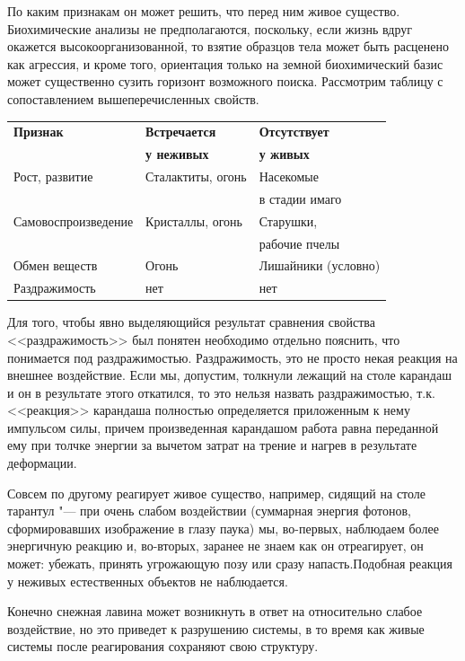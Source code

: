 \documentclass[12pt,a4paper,oneside]{book}
\begin{document}
По каким признакам он может решить, что перед ним живое существо. Биохимические анализы не предполагаются, поскольку, если жизнь вдруг окажется высокоорганизованной, то взятие образцов тела может быть расценено как агрессия, и кроме того, ориентация только на земной биохимический базис может существенно сузить горизонт возможного поиска. Рассмотрим таблицу с сопоставлением вышеперечисленных свойств.

\begin{center}
\begin{tabular}{|l|l|l|}
	\hline
	\textbf{Признак} & \textbf{Встречается} & \textbf{Отсутствует} \\
	& \textbf{у неживых} & \textbf{у живых} \\
	\hline
	Рост, развитие & Сталактиты, огонь & Насекомые \\
	& & в стадии имаго \\
	\hline
	Самовоспроизведение & Кристаллы, огонь & Старушки, \\
	& & рабочие пчелы \\
	\hline
	Обмен веществ & Огонь & Лишайники (условно) \\
	\hline
	Раздражимость & нет & нет \\
	\hline
\end{tabular}
\end{center}

Для того, чтобы явно выделяющийся результат сравнения свойства <<раздражимость>> был понятен необходимо отдельно пояснить, что понимается под раздражимостью. Раздражимость, это не просто некая реакция на внешнее воздействие. Если мы, допустим, толкнули лежащий на столе карандаш и он в результате этого откатился, то это нельзя назвать раздражимостью, т.к. <<реакция>> карандаша полностью определяется приложенным к нему импульсом силы, причем произведенная карандашом работа равна переданной ему при толчке энергии за вычетом затрат на трение и нагрев в результате деформации.

Совсем по другому реагирует живое существо, например, сидящий на столе тарантул "--- при очень слабом воздействии (суммарная энергия фотонов, сформировавших изображение в глазу паука) мы, во-первых, наблюдаем более энергичную реакцию и, во-вторых, заранее не знаем как он отреагирует, он может: убежать, принять угрожающую позу или сразу напасть.Подобная реакция у неживых естественных объектов не наблюдается.

Конечно снежная лавина может возникнуть в ответ на относительно слабое воздействие, но это приведет к разрушению системы, в то время как живые системы после реагирования сохраняют свою структуру.  
\end{document}
